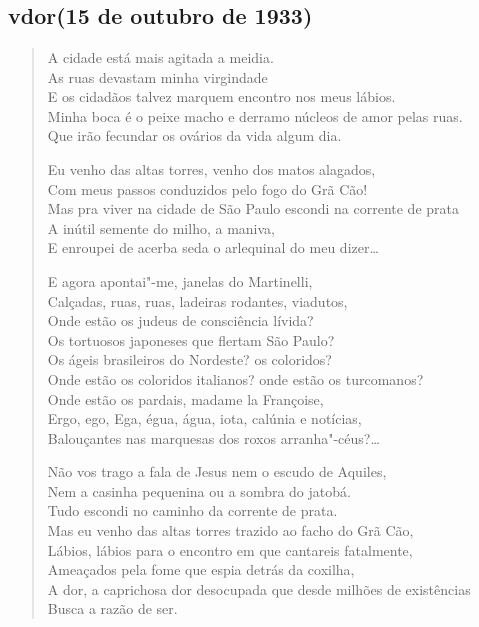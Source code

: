 \chapter*{}
\section*{v\break dor\break (15 de outubro de 1933)}

\begin{verse}
A cidade está mais agitada a meidia.\\
As ruas devastam minha virgindade\\
E os cidadãos talvez marquem encontro nos meus lábios.\\
Minha boca é o peixe macho e derramo núcleos de amor pelas ruas.\\
Que irão fecundar os ovários da vida algum dia.

Eu venho das altas torres, venho dos matos alagados,\\
Com meus passos conduzidos pelo fogo do Grã Cão!\\
Mas pra viver na cidade de São Paulo escondi na corrente de prata\\
A inútil semente do milho, a maniva,\\
E enroupei de acerba seda o arlequinal do meu dizer\ldots{}

E agora apontai"-me, janelas do Martinelli,\\
Calçadas, ruas, ruas, ladeiras rodantes, viadutos,\\
Onde estão os judeus de consciência lívida?\\
Os tortuosos japoneses que flertam São Paulo?\\
Os ágeis brasileiros do Nordeste? os coloridos?\\
Onde estão os coloridos italianos? onde estão os turcomanos?\\
Onde estão os pardais, madame la Françoise,\\
Ergo, ego, Ega, égua, água, iota, calúnia e notícias,\\
Balouçantes nas marquesas dos roxos arranha"-céus?\ldots{}

Não vos trago a fala de Jesus nem o escudo de Aquiles,\\
Nem a casinha pequenina ou a sombra do jatobá.\\
Tudo escondi no caminho da corrente de prata.\\
Mas eu venho das altas torres trazido ao facho do Grã Cão,\\
Lábios, lábios para o encontro em que cantareis fatalmente,\\
Ameaçados pela fome que espia detrás da coxilha,\\
A dor, a caprichosa dor desocupada que desde milhões de existências\\
Busca a razão de ser.
\end{verse}

